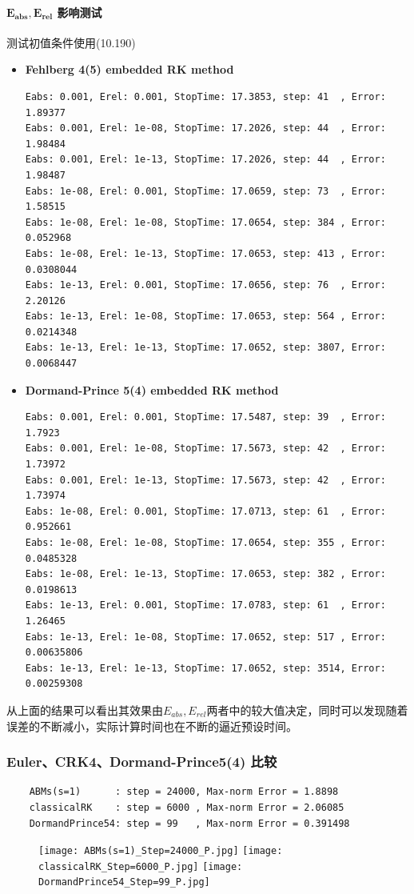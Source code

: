 \documentclass{article}
\begin{document}
\paragraph{$\mathbf{E_{abs},E_{rel}}$ 影响测试}

测试初值条件使用(10.190)
\begin{itemize}
    \item \textbf{Fehlberg 4(5) embedded RK method}
\begin{verbatim}
Eabs: 0.001, Erel: 0.001, StopTime: 17.3853, step: 41  , Error: 1.89377
Eabs: 0.001, Erel: 1e-08, StopTime: 17.2026, step: 44  , Error: 1.98484
Eabs: 0.001, Erel: 1e-13, StopTime: 17.2026, step: 44  , Error: 1.98487
Eabs: 1e-08, Erel: 0.001, StopTime: 17.0659, step: 73  , Error: 1.58515
Eabs: 1e-08, Erel: 1e-08, StopTime: 17.0654, step: 384 , Error: 0.052968
Eabs: 1e-08, Erel: 1e-13, StopTime: 17.0653, step: 413 , Error: 0.0308044
Eabs: 1e-13, Erel: 0.001, StopTime: 17.0656, step: 76  , Error: 2.20126
Eabs: 1e-13, Erel: 1e-08, StopTime: 17.0653, step: 564 , Error: 0.0214348
Eabs: 1e-13, Erel: 1e-13, StopTime: 17.0652, step: 3807, Error: 0.0068447
\end{verbatim}

\item \textbf{Dormand-Prince 5(4) embedded RK method}
\begin{verbatim}
Eabs: 0.001, Erel: 0.001, StopTime: 17.5487, step: 39  , Error: 1.7923
Eabs: 0.001, Erel: 1e-08, StopTime: 17.5673, step: 42  , Error: 1.73972
Eabs: 0.001, Erel: 1e-13, StopTime: 17.5673, step: 42  , Error: 1.73974
Eabs: 1e-08, Erel: 0.001, StopTime: 17.0713, step: 61  , Error: 0.952661
Eabs: 1e-08, Erel: 1e-08, StopTime: 17.0654, step: 355 , Error: 0.0485328
Eabs: 1e-08, Erel: 1e-13, StopTime: 17.0653, step: 382 , Error: 0.0198613
Eabs: 1e-13, Erel: 0.001, StopTime: 17.0783, step: 61  , Error: 1.26465
Eabs: 1e-13, Erel: 1e-08, StopTime: 17.0652, step: 517 , Error: 0.00635806
Eabs: 1e-13, Erel: 1e-13, StopTime: 17.0652, step: 3514, Error: 0.00259308
\end{verbatim}

\end{itemize}

从上面的结果可以看出其效果由$E_{abs},E_{rel}$两者中的较大值决定，同时可以发现随着误差的不断减小，实际计算时间也在不断的逼近预设时间。

\subsubsection{Euler、CRK4、Dormand-Prince5(4) 比较}
\begin{verbatim}
    ABMs(s=1)      : step = 24000, Max-norm Error = 1.8898
    classicalRK    : step = 6000 , Max-norm Error = 2.06085
    DormandPrince54: step = 99   , Max-norm Error = 0.391498
\end{verbatim}
    \begin{figure}[h]
    \centering
    \texttt{[image: ABMs(s=1)\_Step=24000\_P.jpg]}
    \texttt{[image: classicalRK\_Step=6000\_P.jpg]}
    \texttt{[image: DormandPrince54\_Step=99\_P.jpg]}
\end{figure}
\end{document}
